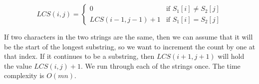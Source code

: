 \documentclass{article} %
\begin{document}
    \begin{equation}
        LCS(i, j) = \begin{cases}
            0 & \text{if $S_1[i] \neq S_2[j]$}\\
            LCS(i - 1, j - 1) + 1 & \text{if $S_1[i] = S_2[j]$}
        \end{cases}
    \end{equation}

    If two characters in the two strings are the same, then we can assume that it will be the start of the longest substring, so we want to increment the count by one at that index. If it continues to be a substring, then $LCS(i+1, j+1)$ will hold the value $LCS(i, j) + 1$. We run through each of the strings once. The time complexity is $O(mn)$.
\end{document}
